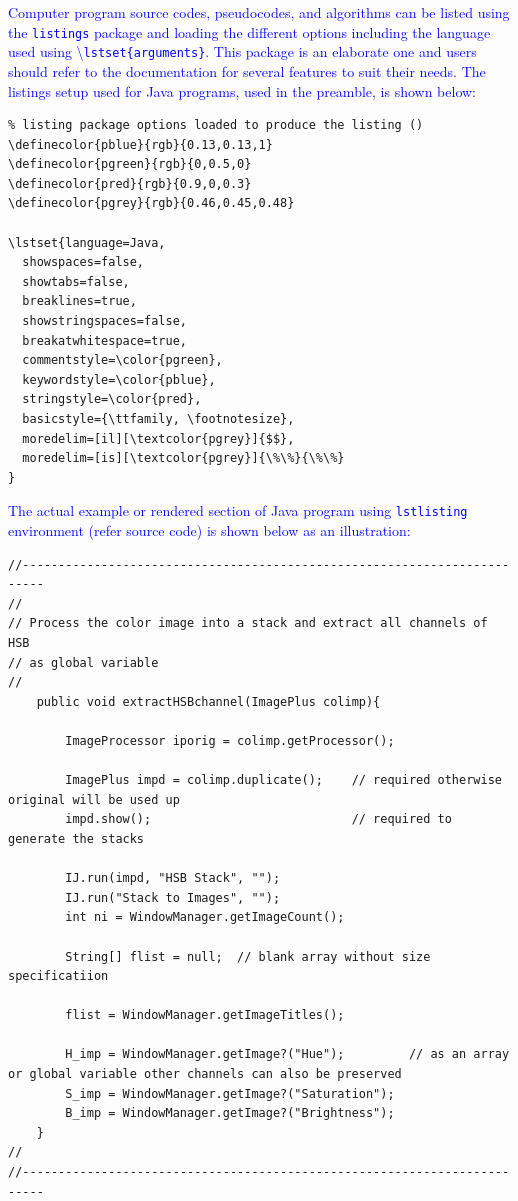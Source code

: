 \documentclass[phd,showgrids]{ndsu-thesis-2022}
\newcommand\italk[1]{\textcolor{blue}{#1}}  %
\newcommand\cmd[1]{\textbackslash\texttt{#1}}  %
\newcommand\vb[1]{\textcolor{blue}{\texttt{#1}}}%
\begin{document}
\italk{Computer program source codes, pseudocodes, and algorithms can be listed using the \vb{listings} package and loading the different options including the language used using \cmd{lstset\{arguments\}}. This package is an elaborate one and users should refer to the documentation for several features to suit their needs. The listings setup used for Java programs, used in the preamble, is shown below:}

{\small
\singlespacing
\begin{verbatim}
% listing package options loaded to produce the listing ()
\definecolor{pblue}{rgb}{0.13,0.13,1}
\definecolor{pgreen}{rgb}{0,0.5,0}
\definecolor{pred}{rgb}{0.9,0,0.3}
\definecolor{pgrey}{rgb}{0.46,0.45,0.48}

\lstset{language=Java, 
  showspaces=false,
  showtabs=false,
  breaklines=true,
  showstringspaces=false,
  breakatwhitespace=true,
  commentstyle=\color{pgreen},
  keywordstyle=\color{pblue},
  stringstyle=\color{pred},
  basicstyle={\ttfamily, \footnotesize},
  moredelim=[il][\textcolor{pgrey}]{$$},
  moredelim=[is][\textcolor{pgrey}]{\%\%}{\%\%}
}
\end{verbatim}
}



\italk{The actual example or rendered section of Java program using \vb{lstlisting} environment (refer source code) is shown below as an illustration:}

{\singlespacing
\begin{lstlisting}
//-------------------------------------------------------------------------
//
// Process the color image into a stack and extract all channels of HSB 
// as global variable
//
	public void extractHSBchannel(ImagePlus colimp){

		ImageProcessor iporig = colimp.getProcessor();
		
		ImagePlus impd = colimp.duplicate();	// required otherwise original will be used up
		impd.show();						    // required to generate the stacks
		
		IJ.run(impd, "HSB Stack", "");
		IJ.run("Stack to Images", "");
		int ni = WindowManager.getImageCount();

		String[] flist = null;  // blank array without size specificatiion

		flist = WindowManager.getImageTitles();
		
		H_imp = WindowManager.getImage?("Hue");			// as an array or global variable other channels can also be preserved
		S_imp = WindowManager.getImage?("Saturation");
		B_imp = WindowManager.getImage?("Brightness");
	}	
//
//-------------------------------------------------------------------------	
\end{lstlisting}
}
\end{document}
